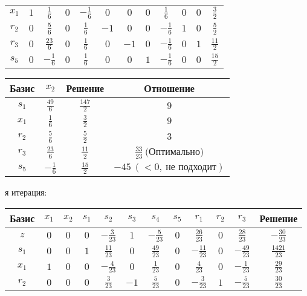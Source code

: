 \documentclass{article}%
\begin{document}
\begin{flushleft}
\begin{tabular}{|c|cccccccccc|c|}
$x_{1}$&$1$&$\frac{1}{6}$&$0$&$-\frac{1}{6}$&$0$&$0$&$0$&$\frac{1}{6}$&$0$&$0$&$\frac{3}{2}$\\%
$r_{2}$&$0$&$\frac{5}{6}$&$0$&$\frac{1}{6}$&$-1$&$0$&$0$&$-\frac{1}{6}$&$1$&$0$&$\frac{5}{2}$\\%
$r_{3}$&$0$&$\frac{23}{6}$&$0$&$\frac{1}{6}$&$0$&$-1$&$0$&$-\frac{1}{6}$&$0$&$1$&$\frac{11}{2}$\\%
$s_{5}$&$0$&$-\frac{1}{6}$&$0$&$\frac{1}{6}$&$0$&$0$&$1$&$-\frac{1}{6}$&$0$&$0$&$\frac{15}{2}$\\%
\hline%
\end{tabular}%
\newline%
\newline%
\newline%
\begin{tabular}{|cccc|}%
\hline%
Базис&$x_{2}$&Решение&Отношение\\%
\hline%
$s_{1}$&$\frac{49}{6}$&$\frac{147}{2}$&$9$\\%
$x_{1}$&$\frac{1}{6}$&$\frac{3}{2}$&$9$\\%
$r_{2}$&$\frac{5}{6}$&$\frac{5}{2}$&$3$\\%
$r_{3}$&$\frac{23}{6}$&$\frac{11}{2}$&$\frac{33}{23}\: \text{(Оптимально)}$\\%
$s_{5}$&$-\frac{1}{6}$&$\frac{15}{2}$&$-45\: (< 0, \: \text{не подходит})$\\%
\hline%
\end{tabular}%
\newline%
\newline%
я итерация: %
\newline%
\newline%
\renewcommand{\arraystretch}{1.3}%
\begin{tabular}{|c|cccccccccc|c|}%
\hline%
Базис&$x_{1}$&$x_{2}$&$s_{1}$&$s_{2}$&$s_{3}$&$s_{4}$&$s_{5}$&$r_{1}$&$r_{2}$&$r_{3}$&Решение\\%
\hline%
$z$&$0$&$0$&$0$&$-\frac{3}{23}$&$1$&$-\frac{5}{23}$&$0$&$\frac{26}{23}$&$0$&$\frac{28}{23}$&$-\frac{30}{23}$\\%
\hline%
$s_{1}$&$0$&$0$&$1$&$\frac{11}{23}$&$0$&$\frac{49}{23}$&$0$&$-\frac{11}{23}$&$0$&$-\frac{49}{23}$&$\frac{1421}{23}$\\%
$x_{1}$&$1$&$0$&$0$&$-\frac{4}{23}$&$0$&$\frac{1}{23}$&$0$&$\frac{4}{23}$&$0$&$-\frac{1}{23}$&$\frac{29}{23}$\\%
$r_{2}$&$0$&$0$&$0$&$\frac{3}{23}$&$-1$&$\frac{5}{23}$&$0$&$-\frac{3}{23}$&$1$&$-\frac{5}{23}$&$\frac{30}{23}$\\%

\end{tabular}
\end{flushleft}
\end{document}

